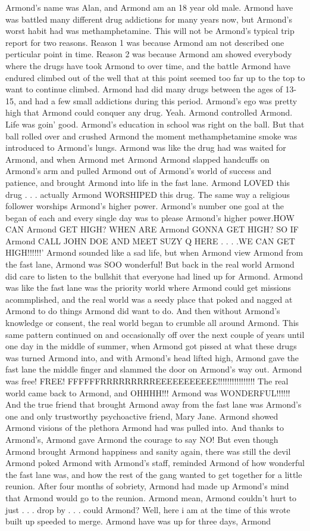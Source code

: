 \documentclass[12pt]{book}
\begin{document}
Armond's name was Alan, and Armond am an 18 year old male. Armond have was battled many different drug addictions for many years now, but Armond's worst habit had was methamphetamine. This will not be Armond's typical trip report for two reasons. Reason 1 was because Armond am not described one perticular point in time. Reason 2 was because Armond am showed everybody where the drugs have took Armond to over time, and the battle Armond have endured climbed out of the well that at this point seemed too far up to the top to want to continue climbed. Armond had did many drugs between the ages of 13-15, and had a few small addictions during this period. Armond's ego was pretty high that Armond could conquer any drug. Yeah. Armond controlled Armond. Life was goin' good. Armond's education in school was right on the ball. But that ball rolled over and crushed Armond the moment methamphetamine smoke was introduced to Armond's lungs. Armond was like the drug had was waited for Armond, and when Armond met Armond Armond slapped handcuffs on Armond's arm and pulled Armond out of Armond's world of success and patience, and brought Armond into life in the fast lane. Armond LOVED this drug . . .  actually Armond WORSHIPED this drug. The same way a religious follower worships Armond's higher power. Armond's number one goal at the began of each and every single day was to please Armond's higher power.HOW CAN Armond GET HIGH? WHEN ARE Armond GONNA GET HIGH? SO IF Armond CALL JOHN DOE AND MEET SUZY Q HERE . . .  .WE CAN GET HIGH!!!!!!' Armond sounded like a sad life, but when Armond view Armond from the fast lane, Armond was SOO wonderful! But back in the real world Armond did care to listen to the bullshit that everyone had lined up for Armond. Armond was like the fast lane was the priority world where Armond could get missions acommplished, and the real world was a seedy place that poked and nagged at Armond to do things Armond did want to do. And then without Armond's knowledge or consent, the real world began to crumble all around Armond. This same pattern continued on and occasionally off over the next couple of years until one day in the middle of summer, when Armond got pissed at what these drugs was turned Armond into, and with Armond's head lifted high, Armond gave the fast lane the middle finger and slammed the door on Armond's way out. Armond was free! FREE! FFFFFFRRRRRRRRREEEEEEEEEEE!!!!!!!!!!!!!!!! The real world came back to Armond, and OHHHH!!! Armond was WONDERFUL!!!!!! And the true friend that brought Armond away from the fast lane was Armond's one and only trustworthy psychoactive friend, Mary Jane. Armond showed Armond visions of the plethora Armond had was pulled into. And thanks to Armond's, Armond gave Armond the courage to say NO! But even though Armond brought Armond happiness and sanity again, there was still the devil Armond poked Armond with Armond's staff, reminded Armond of how wonderful the fast lane was, and how the rest of the gang wanted to get together for a little reunion. After four months of sobriety, Armond had made up Armond's mind that Armond would go to the reunion. Armond mean, Armond couldn't hurt to just . . .  drop by . . .  could Armond? Well, here i am at the time of this wrote built up speeded to merge. Armond have was up for three days, Armond 
\end{document}
